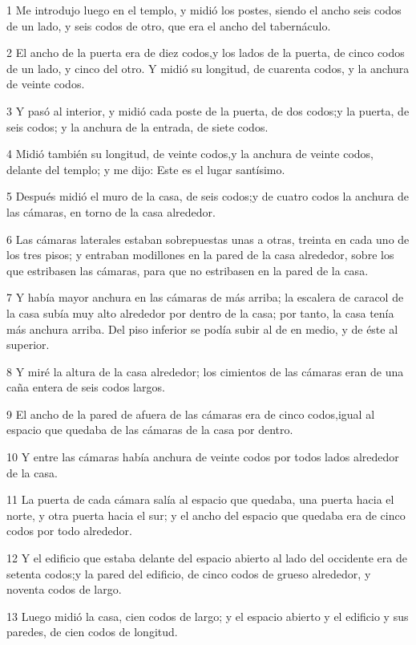 \par 1 Me introdujo luego en el templo, y midió los postes, siendo el ancho seis codos de un lado, y seis codos de otro, que era el ancho del tabernáculo.
\par 2 El ancho de la puerta era de diez codos,y los lados de la puerta, de cinco codos de un lado, y cinco del otro. Y midió su longitud, de cuarenta codos, y la anchura de veinte codos.
\par 3 Y pasó al interior, y midió cada poste de la puerta, de dos codos;y la puerta, de seis codos; y la anchura de la entrada, de siete codos.
\par 4 Midió también su longitud, de veinte codos,y la anchura de veinte codos, delante del templo; y me dijo: Este es el lugar santísimo.
\par 5 Después midió el muro de la casa, de seis codos;y de cuatro codos la anchura de las cámaras, en torno de la casa alrededor.
\par 6 Las cámaras laterales estaban sobrepuestas unas a otras, treinta en cada uno de los tres pisos; y entraban modillones en la pared de la casa alrededor, sobre los que estribasen las cámaras, para que no estribasen en la pared de la casa.
\par 7 Y había mayor anchura en las cámaras de más arriba; la escalera de caracol de la casa subía muy alto alrededor por dentro de la casa; por tanto, la casa tenía más anchura arriba. Del piso inferior se podía subir al de en medio, y de éste al superior.
\par 8 Y miré la altura de la casa alrededor; los cimientos de las cámaras eran de una caña entera de seis codos largos.
\par 9 El ancho de la pared de afuera de las cámaras era de cinco codos,igual al espacio que quedaba de las cámaras de la casa por dentro.
\par 10 Y entre las cámaras había anchura de veinte codos por todos lados alrededor de la casa.
\par 11 La puerta de cada cámara salía al espacio que quedaba, una puerta hacia el norte, y otra puerta hacia el sur; y el ancho del espacio que quedaba era de cinco codos por todo alrededor.
\par 12 Y el edificio que estaba delante del espacio abierto al lado del occidente era de setenta codos;y la pared del edificio, de cinco codos de grueso alrededor, y noventa codos de largo.
\par 13 Luego midió la casa, cien codos de largo; y el espacio abierto y el edificio y sus paredes, de cien codos de longitud.

